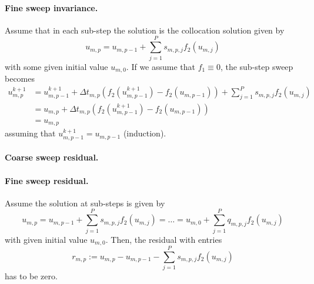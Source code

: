 \documentclass{article}
\begin{document}
\paragraph{Fine sweep invariance.}
Assume that in each sub-step the solution is the collocation solution given by
\begin{equation}
	u_{m,p} = u_{m,p-1} + \sum_{j=1}^{P} s_{m,p,j} f_2(u_{m,j})
\end{equation}
with some given initial value $u_{m,0}$.
If we assume that $f_1 \equiv 0$, the sub-step sweep becomes
\begin{align*}
	u^{k+1}_{m,p} &= u^{k+1}_{m,p-1} + \Delta t_{m,p} \left( f_2(u^{k+1}_{m,p-1}) - f_2(u_{m,p-1}) \right) + \sum_{j=1}^{P} s_{m,p,j} f_2(u_{m,j}) \\
				  &= u_{m,p}  + \Delta t_{m,p} \left( f_2(u^{k+1}_{m,p-1}) - f_2(u_{m,p-1}) \right) \\
				  &= u_{m,p}
\end{align*}
assuming that $u^{k+1}_{m,p-1} = u_{m,p-1}$ (induction).

\paragraph{Coarse sweep residual.}

\paragraph{Fine sweep residual.}
Assume the solution at sub-steps is given by
\begin{equation}
	u_{m,p} = u_{m,p-1} + \sum_{j=1}^{P} s_{m,p,j} f_2(u_{m,j}) = \ldots = u_{m,0} +  \sum_{j=1}^{P} q_{m,p,j} f_2(u_{m,j})
\end{equation}
with given initial value $u_{m,0}$.
Then, the residual with entries
\begin{equation}
	r_{m,p} := u_{m,p} - u_{m,p-1} - \sum_{j=1}^{P} s_{m,p,j} f_2(u_{m,j})
\end{equation}
has to be zero.

\end{document}
